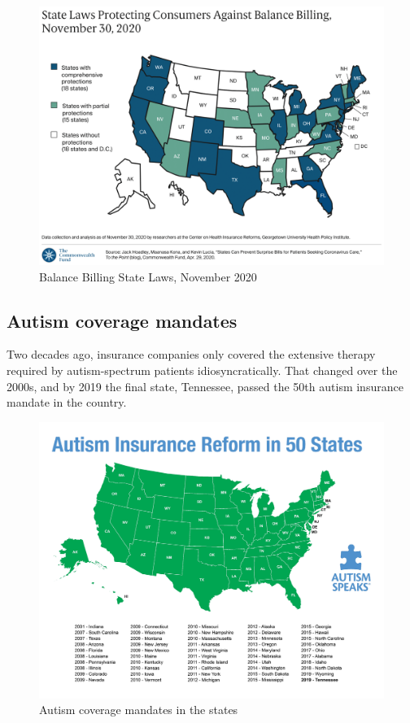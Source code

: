 \documentclass[
  oneside]{book}
\begin{document}
\begin{figure}
\includegraphics[width=0.99\linewidth]{Plots/Web/state_balance_billing_map_feb21} \caption{Balance Billing State Laws, November 2020}\label{fig:surprise-us}
\end{figure}

\hypertarget{autism-coverage-mandates}{%
\subsection{Autism coverage mandates}\label{autism-coverage-mandates}}

Two decades ago, insurance companies only covered the extensive therapy required by autism-spectrum patients idiosyncratically. That changed over the 2000s, and by 2019 the final state, Tennessee, passed the 50th autism insurance mandate in the country.

\begin{figure}
\includegraphics[width=0.99\linewidth]{Plots/Web/autism_coverage_map} \caption{Autism coverage mandates in the states}\label{fig:autism-map}
\end{figure}
\end{document}
